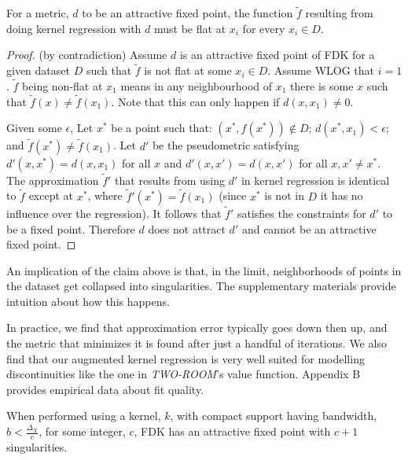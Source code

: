 \documentclass{article} %
\newenvironment{claim}[1][Claim]{\begin{trivlist}
\item[\hskip \labelsep {\bfseries #1}]}{\end{trivlist}}
\begin{document}
\begin{claim}
For a metric, $d$ to be an attractive fixed point, the function $\tilde f$ resulting from doing
kernel regression with $d$ must be flat at $x_i$ for every $x_i \in D$.
\end{claim}
\begin{proof}(by contradiction)
Assume $d$ is an attractive fixed point of FDK for a given dataset $D$ such that $\tilde f$
is not flat at some $x_i \in D$. Assume WLOG that $i=1$.
$\tilde f$ being non-flat at $x_1$ means in any neighbourhood of $x_1$
there is some $x$ such that
$\tilde f(x) \neq \tilde f(x_1)$.
Note that this can only happen if $d(x,x_1) \neq 0$.

Given some $\epsilon$, Let $x^*$ be a point such that: $(x^*, f(x^*)) \notin D$;
$d(x^*,x_1) < \epsilon$; and $\tilde f(x^*) \neq \tilde f(x_1)$.
Let $d'$ be the pseudometric satisfying $d'(x,x^*) = d(x,x_1)$ for all $x$
and $d'(x,x') = d(x,x')$ for all $x, x' \neq x^*$.
The approximation $\tilde f'$ that results from using $d'$ in kernel regression
is identical to $\tilde f$ except at $x^*$, where
$\tilde f'(x^*) = \tilde f(x_1)$ (since $x^*$ is not in $D$ it has no influence over the regression).
It follows that $\tilde f'$ satisfies the constraints for $d'$ to be a fixed point.
Therefore $d$ does not attract $d'$ and cannot be an attractive fixed point.
\end{proof}

An implication of the claim above is that, in the limit, neighborhoods of points in the dataset get collapsed
into singularities. The supplementary materials provide intuition about how this happens.

In practice, we find that approximation error typically goes down then up,
and the metric that minimizes it is found after just a handful of iterations.
We also find that our augmented kernel regression is  very well suited for modelling
discontinuities like the one in \textit{TWO-ROOM}'s value function.
Appendix B provides empirical data about fit quality.

\begin{claim}When performed using a kernel, $k$, with compact support having
bandwidth,
$b < \frac{\Delta_X}{c}$, for some integer, $c$, FDK has an 
attractive fixed point with $c + 1$ singularities.\end{claim}
\end{document}
